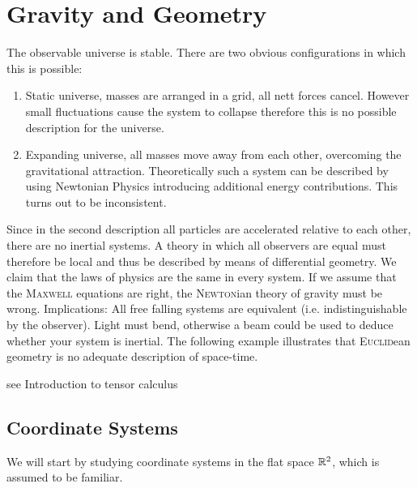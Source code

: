 \chapter{Gravity and Geometry}
The observable universe is stable. There are two obvious configurations in which this is possible:
\begin{enumerate}
    \item Static universe, masses are arranged in a grid, all nett forces cancel.
    However small fluctuations cause the system to collapse therefore this is
    no possible description for the universe. 
    \item Expanding universe, all masses move away from each other, overcoming the gravitational attraction.
    Theoretically such a system can be described by using Newtonian Physics introducing additional energy contributions.
    This turns out to be inconsistent.
\end{enumerate}
Since in the second description all particles are accelerated relative to each other, there are no inertial systems.
A theory in which all observers are equal must therefore be local and thus be described by means of differential geometry.
We claim that the laws of physics are the same in every system.
If we assume that the \textsc{Maxwell} equations are right, the
\textsc{Newton}ian theory of gravity must be wrong.
Implications:
All free falling systems are equivalent (i.e. indistinguishable by the observer).
Light must bend, otherwise a beam could be used to deduce whether your system is inertial.
The following example illustrates that \textsc{Euclid}ean geometry is no
adequate description of space-time.
\begin{example}
see Introduction to tensor calculus
\end{example}
\section{Coordinate Systems}
We will start by studying coordinate systems in the flat space $\mathbb{R}^2$, which
is assumed to be familiar.
